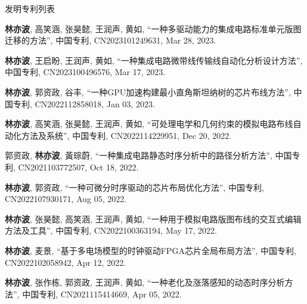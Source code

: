 \begin{rSection}{发明专利列表}
\begin{description}[font=\normalfont, rightmargin=2em]
{}
            

\item[{[P14]}]{
        \textbf{林亦波}, 高笑涵, 张昊懿, 王润声, 黄如, 
    ``一种多驱动能力的集成电路标准单元版图迁移的方法'', 
    中国专利, CN2023101249631, Mar 28, 2023.
    
}
            

\item[{[P13]}]{
        \textbf{林亦波}, 王启盼, 王润声, 黄如, 
    ``一种集成电路微带线传输线自动化分析设计方法'', 
    中国专利, CN2023100496576, Mar 17, 2023.
    
}
            

\item[{[P12]}]{
        \textbf{林亦波}, 郭资政, 谷丰, 
    ``一种GPU加速构建最小直角斯坦纳树的芯片布线方法'', 
    中国专利, CN2022112858018, Jan 03, 2023.
    
}
            

\item[{[P11]}]{
        \textbf{林亦波}, 高笑涵, 张昊懿, 王润声, 黄如, 
    ``可处理电学和几何约束的模拟电路布线自动化方法及系统'', 
    中国专利, CN2022114229951, Dec 20, 2022.
    
}
            

\item[{[P10]}]{
        郭资政, \textbf{林亦波}, 黃琮蔚, 
    ``一种集成电路静态时序分析中的路径分析方法'', 
    中国专利, CN2021103772507, Oct 18, 2022.
    
}
            

\item[{[P9]}]{
        \textbf{林亦波}, 郭资政, 
    ``一种可微分时序驱动的芯片布局优化方法'', 
    中国专利, CN2022107930171, Aug 05, 2022.
    
}
            

\item[{[P8]}]{
        \textbf{林亦波}, 张昊懿, 高笑涵, 王润声, 黄如, 
    ``一种用于模拟电路版图布线的交互式编辑方法及工具'', 
    中国专利, CN2022100363194, May 17, 2022.
    
}
            

\item[{[P7]}]{
        \textbf{林亦波}, 麦景, 
    ``基于多电场模型的时钟驱动FPGA芯片全局布局方法'', 
    中国专利, CN2022102058942, Apr 12, 2022.
    
}
            

\item[{[P6]}]{
        \textbf{林亦波}, 张作栋, 郭资政, 王润声, 黄如, 
    ``一种老化及涨落感知的动态时序分析方法'', 
    中国专利, CN2021115414669, Apr 05, 2022.
    
}
\end{description}
\end{rSection}
